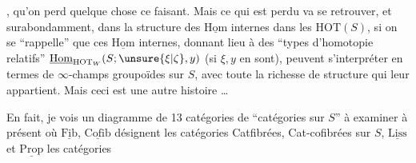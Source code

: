 , qu'on perd quelque chose ce faisant.
Mais ce qui est perdu va se retrouver, et
surabondamment, dans la structure des
$\underline{\mathrm{Hom}}$ internes dans les $\mathrm{HOT}(S)$, si on se
``rappelle'' que ces $\underline{\mathrm{Hom}}$ internes, donnant
lieu à des ``types d'homotopie relatifs''
$\underline{\mathrm{Hom}}_{\mathrm{HOT}_W}(S;\unsure{\xi|\zeta},y)$ (si $\xi,y$ en sont), peuvent
s'interpréter en termes de $\infty$-champs  
groupoïdes sur $S$, avec toute la richesse de
structure qui leur appartient. Mais ceci est
une autre histoire \ldots

En fait, je vois un diagramme de
13 catégories de ``catégories sur $S$''\unsure{,} à examiner
à présent
où $\underline{\mathrm{Fib}}$, $\underline{\mathrm{Cofib}}$ désignent les catégories Catfibrées,
Cat-cofibrées sur $S$, $\underline{\mathrm{Liss}}$  et $\underline{\mathrm{Prop}}$ les catégories
